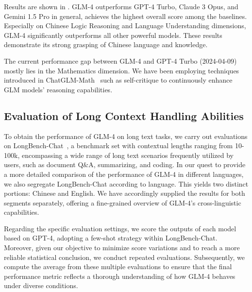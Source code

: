 Results are shown in .
GLM-4 outperforms GPT-4 Turbo, Claude 3 Opus, and Gemini 1.5 Pro in general, achieves the highest overall score among the baselines.
Especially on Chinese Logic Reasoning and Language Understanding dimensions, GLM-4 significantly outperforms all other powerful models.
These results demonstrate its strong grasping of Chinese language and knowledge.

The current performance gap between GLM-4 and GPT-4 Turbo (2024-04-09) mostly lies in the Mathematics dimension.
We have been employing techniques introduced in ChatGLM-Math~\cite{xu2024chatglmmath} such as self-critique to continuously enhance GLM models' reasoning capabilities.



\subsection{Evaluation of Long Context Handling Abilities}

To obtain the performance of GLM-4 on long text tasks, we carry out evaluations on LongBench-Chat~\cite{bai2024longalign}, a benchmark set with contextual lengths ranging from 10-100k, encompassing a wide range of long text scenarios frequently utilized by users, such as document Q\&A, summarizing, and coding. In our quest to provide a more detailed comparison of the performance of GLM-4 in different languages, we also segregate LongBench-Chat according to language. This yields two distinct portions: Chinese and English. We have accordingly supplied the results for both segments separately, offering a fine-grained overview of GLM-4's cross-linguistic capabilities.

Regarding the specific evaluation settings, we score the outputs of each model based on GPT-4, adopting a few-shot strategy within LongBench-Chat. Moreover, given our objective to minimize score variations and to reach a more reliable statistical conclusion, we conduct repeated evaluations. Subsequently, we compute  the average  from these multiple evaluations to ensure that the final performance metric reflects a thorough understanding of how GLM-4 behaves under diverse conditions.

